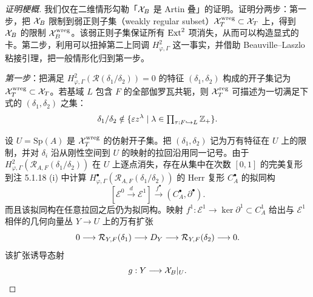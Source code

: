 \begin{proof}[证明梗概]
我们仅在二维情形勾勒「$\mathcal{X}_B$ 是 Artin 叠」的证明。证明分两步：第一步，把 $\mathcal{X}_B$ 限制到弱正则子集（weakly regular subset）$\mathcal{X}_T^{\mathrm{wreg}}\subset\mathcal{X}_T$ 上，得到 $\mathcal{X}_B$ 的限制 $\mathcal{X}_B^{\mathrm{wreg}}$。该弱正则子集保证所有 $\operatorname{Ext}^2$ 项消失，从而可以构造显式的卡。第二步，利用可以扭掉第二上同调 $H^2_{\varphi,\Gamma}$ 这一事实，并借助 Beauville–Laszlo 粘接引理，把一般情形化归到第一步。

\emph{第一步}：把满足 $H^2_{\varphi,\Gamma}(\mathcal R(\delta_1/\delta_2))=0$ 的特征 $(\delta_1,\delta_2)$ 构成的开子集记为 $\mathcal{X}_T^{\mathrm{wreg}}\subset\mathcal{X}_T$。若基域 $L$ 包含 $F$ 的全部伽罗瓦共轭，则 $\mathcal{X}_T^{\mathrm{reg}}$ 可描述为一切满足下式的 $(\delta_1,\delta_2)$ 之集：
\[
\delta_1/\delta_2\notin\{\varepsilon z^\lambda\mid\lambda\in\textstyle\prod_{\tau:F\hookrightarrow L}\mathbb{Z}_+\}.
\]

设 $U=\mathrm{Sp}(A)$ 是 $\mathcal{X}_T^{\mathrm{wreg}}$ 的仿射开子集。把 $(\delta_1,\delta_2)$ 记为万有特征在 $U$ 上的限制，并对 $\delta_i$ 沿从刚性空间到 $U$ 的映射的拉回沿用同一记号。由于 $H^2_{\varphi,\Gamma}(\mathcal R_{A,F}(\delta_1/\delta_2))$ 在 $U$ 上逐点消失，存在从集中在次数 $[0,1]$ 的完美复形到注 5.1.18 (i) 中计算 $H^\bullet_{\varphi,\Gamma}(\mathcal R_{A,F}(\delta_1/\delta_2))$ 的 Herr 复形 $C^\bullet_A$ 的拟同构
\[
[\mathcal E^0\xrightarrow{d}\mathcal E^1]\xrightarrow{f^\bullet}(C^\bullet_A,\partial^\bullet).
\]
而且该拟同构在任意拉回之后仍为拟同构。映射 $f^1:\mathcal E^1\to\ker\partial^1\subset C^1_A$ 给出与 $\mathcal E^1$ 相伴的几何向量丛 $Y\to U$ 上的万有扩张
\[
0\longrightarrow\mathcal R_{Y,F}(\delta_1)\longrightarrow D_Y\longrightarrow\mathcal R_{Y,F}(\delta_2)\longrightarrow 0.
\]
该扩张诱导态射
\[
g:Y\longrightarrow\mathcal{X}_B|_U.
\]


\end{proof}
